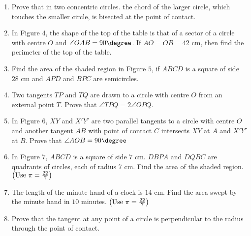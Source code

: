 \begin{enumerate}
\item Prove that in two concentric circles. the chord of the larger circle, which touches the smaller circle, is bisected at the point of contact.\\

\item In Figure $4$, the shape of the top of the table is that of a sector of a circle with centre $O$ and $\angle OAB = 90\degree$. If $AO = OB = 42\text{ cm}$, then find the perimeter of the top of the table.\\

\item Find the area of the shaded region in Figure $5$, if $ABCD$ is a square of side $28\text{ cm}$ and $APD$ and $BPC$ are semicircles.\\
\item Two tangents $TP$ and $TQ$ are drawn to a circle with centre $O$ from an external point $T$. Prove that $\angle TPQ = 2\angle OPQ$.\\

\item In Figure $6$, $XY$ and $X'Y'$ are two parallel tangents to a circle with centre $O$ and another tangent $AB$ with point of contact $C$ intersects $XY$ at $A$ and $X'Y'$ at $B$. Prove that $\angle AOB = 90\degree$\\
\item In Figure $7$, $ABCD$ is a square of side $7\text{ cm}$. $DBPA$ and $DQBC$ are quadrants of circles, each of radius $7\text{ cm}$. Find the area of the shaded region.$\left(\text{Use } \pi = \frac{22}{7}\right)$\\
\item The length of the minute hand of a clock is $14\text{ cm}$. Find the area swept by the minute hand in $10$ minutes. $\left(\text{Use } \pi = \frac{22}{7}\right)$\\
\item Prove that the tangent at any point of a circle is perpendicular to the radius through the point of contact.\\
\end{enumerate}
